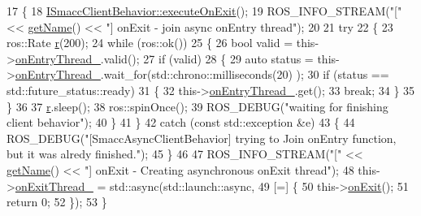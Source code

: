 \begin{DoxyCode}
17     \{
18         \hyperlink{classsmacc_1_1ISmaccClientBehavior_ac88fbad78c928b4bca6d18659ddfd8c0}{ISmaccClientBehavior::executeOnExit}();
19         ROS\_INFO\_STREAM(\textcolor{stringliteral}{"["} << \hyperlink{classsmacc_1_1ISmaccClientBehavior_a18e4bec9460b010f2894c0f7e7064a34}{getName}() << \textcolor{stringliteral}{"] onExit - join async onEntry thread"});
20 
21         \textcolor{keywordflow}{try}
22         \{
23             ros::Rate \hyperlink{namespacefake__cube__perception__node_a36e88703ab69fd35065e8a8d9344903e}{r}(200);
24             \textcolor{keywordflow}{while} (ros::ok())
25             \{
26                 \textcolor{keywordtype}{bool} valid = this->\hyperlink{classsmacc_1_1SmaccAsyncClientBehavior_a6346e036a68f41c4397d7336f8519645}{onEntryThread\_}.valid();
27                 \textcolor{keywordflow}{if} (valid)
28                 \{
29                     \textcolor{keyword}{auto} status = this->\hyperlink{classsmacc_1_1SmaccAsyncClientBehavior_a6346e036a68f41c4397d7336f8519645}{onEntryThread\_}.wait\_for(std::chrono::milliseconds(20)
      );
30                     \textcolor{keywordflow}{if} (status == std::future\_status::ready)
31                     \{
32                         this->\hyperlink{classsmacc_1_1SmaccAsyncClientBehavior_a6346e036a68f41c4397d7336f8519645}{onEntryThread\_}.get();
33                         \textcolor{keywordflow}{break};
34                     \}
35                 \}
36 
37                 \hyperlink{namespacefake__cube__perception__node_a36e88703ab69fd35065e8a8d9344903e}{r}.sleep();
38                 ros::spinOnce();
39                 ROS\_DEBUG(\textcolor{stringliteral}{"waiting for finishing client behavior"});
40             \}
41         \}
42         \textcolor{keywordflow}{catch} (\textcolor{keyword}{const} std::exception &e)
43         \{
44             ROS\_DEBUG(\textcolor{stringliteral}{"[SmaccAsyncClientBehavior] trying to Join onEntry function, but it was alredy
       finished."});
45         \}
46 
47         ROS\_INFO\_STREAM(\textcolor{stringliteral}{"["} << \hyperlink{classsmacc_1_1ISmaccClientBehavior_a18e4bec9460b010f2894c0f7e7064a34}{getName}() << \textcolor{stringliteral}{"] onExit - Creating asynchronous onExit thread"});
48         this->\hyperlink{classsmacc_1_1SmaccAsyncClientBehavior_af76d1c36b4a10425f2da043545b73299}{onExitThread\_} = std::async(std::launch::async,
49                                          [=] \{
50                                              this->\hyperlink{classsmacc_1_1ISmaccClientBehavior_a36bf771905e3bf750909a15e4215a9b3}{onExit}();
51                                              \textcolor{keywordflow}{return} 0;
52                                          \});
53     \}
\end{DoxyCode}
